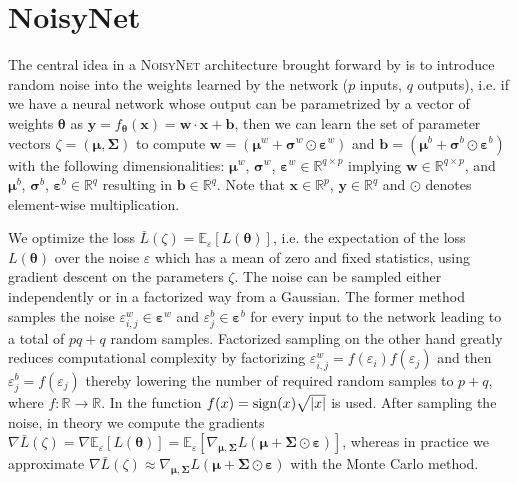 \clearpage
\hypertarget{algo-noisynet}{\section{NoisyNet}}

\noindent The central idea in a \textsc{NoisyNet} architecture brought forward by \cite{noisynet-paper} is to introduce random noise into the weights learned by the network ($p$ inputs, $q$ outputs), i.e. if we have a neural network whose output can be parametrized by a vector of weights $\boldsymbol{\theta}$ as $\textbf{y} = f_{\boldsymbol{\theta}}(\textbf{x}) = \textbf{w} \cdot \textbf{x} + \textbf{b}$, then we can learn the set of parameter vectors $\zeta = (\boldsymbol{\mu}, \boldsymbol{\Sigma})$ to compute $\textbf{w} = (\boldsymbol{\mu}^{w} + \boldsymbol{\sigma}^{w} \odot \boldsymbol{\varepsilon}^{w})$ and $\textbf{b} = (\boldsymbol{\mu}^{b} + \boldsymbol{\sigma}^{b} \odot \boldsymbol{\varepsilon}^{b})$ with the following dimensionalities: $\boldsymbol{\mu}^{w}$, $\boldsymbol{\sigma}^{w}$, $\boldsymbol{\varepsilon}^{w} \in \mathbb{R}^{q \times p}$ implying $\textbf{w} \in \mathbb{R}^{q \times p}$, and $\boldsymbol{\mu}^{b}$, $\boldsymbol{\sigma}^{b}$, $\boldsymbol{\varepsilon}^{b} \in \mathbb{R}^{q}$ resulting in $\textbf{b} \in \mathbb{R}^{q}$. Note that $\textbf{x} \in \mathbb{R}^{p}$, $\textbf{y} \in \mathbb{R}^{q}$ and $\odot$ denotes element-wise multiplication.

\noindent We optimize the loss $\bar{L}(\zeta) = \mathbb{E}_{\varepsilon}[L(\boldsymbol{\theta})]$, i.e. the expectation of the loss $L(\boldsymbol{\theta})$ over the noise $\varepsilon$ which has a mean of zero and fixed statistics, using gradient descent on the parameters $\zeta$. The noise can be sampled either independently or in a factorized way from a Gaussian. The former method samples the noise $\varepsilon^{w}_{i,j} \in \boldsymbol{\varepsilon}^{w}$ and $\varepsilon^{b}_{j} \in \boldsymbol{\varepsilon}^{b}$ for every input to the network leading to a total of $pq + q$ random samples. Factorized sampling on the other hand greatly reduces computational complexity by factorizing $\varepsilon^{w}_{i,j} = f(\varepsilon_{i}) f(\varepsilon_{j})$ and then $\varepsilon^{b}_{j} = f(\varepsilon_{j})$ thereby lowering the number of required random samples to $p + q$, where $f: \mathbb{R} \rightarrow \mathbb{R}$. In \cite{noisynet-paper} the function $f(x) = \operatorname{sign}(x) \sqrt{|x|}$ is used. After sampling the noise, in theory we compute the gradients $\nabla\bar{L}(\zeta) = \nabla\mathbb{E}_{\varepsilon}[L(\boldsymbol{\theta})] = \mathbb{E}_{\varepsilon}[\nabla_{\boldsymbol{\mu}, \boldsymbol{\Sigma}}L(\boldsymbol{\mu} + \boldsymbol{\Sigma} \odot \boldsymbol{\varepsilon})]$, whereas in practice we approximate $\nabla\bar{L}(\zeta) \approx \nabla_{\boldsymbol{\mu}, \boldsymbol{\Sigma}}L(\boldsymbol{\mu} + \boldsymbol{\Sigma} \odot \boldsymbol{\varepsilon})$ with the Monte Carlo method.

